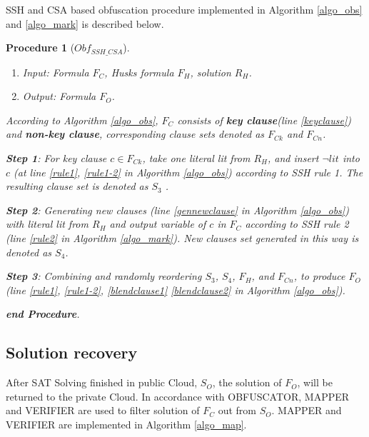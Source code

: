 \documentclass[conference]{IEEEtran}
\newtheorem{Procedure}{\textbf{Procedure}}
\begin{document}
SSH and CSA based obfuscation procedure implemented in Algorithm \ref{algo_obs} and \ref{algo_mark} is described below.
\begin{Procedure}[${Obf_{SSH\_CSA}}$]\label{obsprocedure}~
\begin{enumerate}
\item Input:
Formula $F_C$, Husks formula $F_H$, solution $R_H$.
\item Output:
Formula $F_O$.
\end{enumerate}
According to Algorithm \ref{algo_obs}, 
$F_C$ consists of \textbf{key clause}(line \ref{keyclause}) and \textbf{non-key clause}, 
corresponding clause sets denoted as \textbf{$F_{Ck}$} and \textbf{$F_{Cn}$}.

\textbf{Step 1}: 
For key clause $c\in F_{Ck}$, 
take one literal lit from $R_H$, 
and insert $\neg lit$ into $c$ (at line \ref{rule1}, \ref{rule1-2} in Algorithm \ref{algo_obs})  according to  SSH rule 1.
The resulting clause set is denoted as $S_3$ .

\textbf{Step 2}: 
Generating new clauses  (line \ref{gennewclause} in Algorithm \ref{algo_obs}) with literal lit from $R_H$ and output variable of $c$ in $F_C$ according to SSH rule 2 (line \ref{rule2} in Algorithm \ref{algo_mark}).
New clauses set generated in this way is denoted as $S_4$.

\textbf{Step 3}: 
Combining and randomly reordering $S_3$, $S_4$, $F_H$, and $F_{Cn}$, to produce $F_O$ (line \ref{rule1}, \ref{rule1-2}, \ref{blendclause1} \ref{blendclause2} in Algorithm \ref{algo_obs}).

\textit{\textbf{end Procedure}}.
\end{Procedure}

\subsection{Solution recovery}\label{mappping}
After SAT Solving finished in public Cloud, $S_O$, 
the solution of $F_O$, will be returned to the private Cloud.
In accordance with OBFUSCATOR, 
MAPPER and VERIFIER are used to filter solution of $F_C$ out from  $S_O$.
MAPPER and VERIFIER are implemented in Algorithm \ref{algo_map}.
\end{document}
